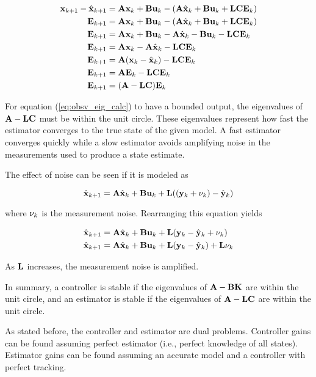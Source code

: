 \begin{align}
  \mathbf{x}_{k+1} - \hat{\mathbf{x}}_{k+1} &= \mathbf{A}\mathbf{x}_k + \mathbf{B}\mathbf{u}_k -
    (\mathbf{A}\hat{\mathbf{x}}_k + \mathbf{B}\mathbf{u}_k +
     \mathbf{L}\mathbf{C}\mathbf{E}_k) \nonumber \\
  \mathbf{E}_{k+1} &= \mathbf{A}\mathbf{x}_k + \mathbf{B}\mathbf{u}_k -
    (\mathbf{A}\hat{\mathbf{x}}_k + \mathbf{B}\mathbf{u}_k + \mathbf{L}\mathbf{C}\mathbf{E}_k)
    \nonumber \\
  \mathbf{E}_{k+1} &= \mathbf{A}\mathbf{x}_k + \mathbf{B}\mathbf{u}_k -
    \mathbf{A}\hat{\mathbf{x}}_k - \mathbf{B}\mathbf{u}_k - \mathbf{L}\mathbf{C}\mathbf{E}_k
    \nonumber \\
  \mathbf{E}_{k+1} &= \mathbf{A}\mathbf{x}_k - \mathbf{A}\hat{\mathbf{x}}_k -
    \mathbf{L}\mathbf{C}\mathbf{E}_k \nonumber \\
  \mathbf{E}_{k+1} &= \mathbf{A}(\mathbf{x}_k - \hat{\mathbf{x}}_k) -
    \mathbf{L}\mathbf{C}\mathbf{E}_k \nonumber \\
  \mathbf{E}_{k+1} &= \mathbf{A}\mathbf{E}_k - \mathbf{L}\mathbf{C}\mathbf{E}_k \nonumber \\
  \mathbf{E}_{k+1} &= (\mathbf{A} - \mathbf{L}\mathbf{C})\mathbf{E}_k \label{eq:obsv_eig_calc}
\end{align}

For equation (\ref{eq:obsv_eig_calc}) to have a bounded output, the eigenvalues
of $\mathbf{A} - \mathbf{L}\mathbf{C}$ must be within the unit circle. These eigenvalues
represent how fast the estimator converges to the true state of the given
\gls{model}. A fast estimator converges quickly while a slow estimator avoids
amplifying noise in the measurements used to produce a state estimate.

The effect of noise can be seen if it is modeled
 as

\begin{equation*}
  \hat{\mathbf{x}}_{k+1} = \mathbf{A}\hat{\mathbf{x}}_k + \mathbf{B}\mathbf{u}_k +
    \mathbf{L} ((\mathbf{y}_k + \mathbf{\nu}_k) - \hat{\mathbf{y}}_k) \\
\end{equation*}

where $\mathbf{\nu}_k$ is the measurement noise. Rearranging this equation yields

\begin{align*}
  \hat{\mathbf{x}}_{k+1} &= \mathbf{A}\hat{\mathbf{x}}_k + \mathbf{B}\mathbf{u}_k +
    \mathbf{L} (\mathbf{y}_k - \hat{\mathbf{y}}_k + \mathbf{\nu}_k) \\
  \hat{\mathbf{x}}_{k+1} &= \mathbf{A}\hat{\mathbf{x}}_k + \mathbf{B}\mathbf{u}_k +
    \mathbf{L} (\mathbf{y}_k - \hat{\mathbf{y}}_k) + \mathbf{L}\mathbf{\nu}_k
\end{align*}

As $\mathbf{L}$ increases, the measurement noise is amplified.

In summary, a controller is stable if the eigenvalues of
$\mathbf{A} - \mathbf{B}\mathbf{K}$ are within the unit circle, and an estimator is
stable if the eigenvalues of $\mathbf{A} - \mathbf{L}\mathbf{C}$ are within the unit
circle.

As stated before, the controller and estimator are dual problems. Controller
gains can be found assuming perfect estimator (i.e., perfect knowledge of all
\glspl{state}). Estimator gains can be found assuming an accurate \gls{model}
and a controller with perfect \gls{tracking}.
